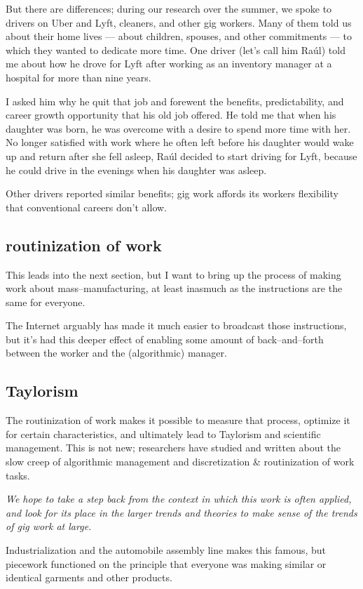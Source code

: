 \documentclass{sigchi}
\begin{document}
But there are differences; during our research over the summer,
we spoke to drivers on Uber and Lyft, cleaners, and other gig workers.
Many of them told us about their home lives
--- about children, spouses, and other commitments ---
to which they wanted to dedicate more time.
One driver
(let's call him Ra\'{u}l)
told me about how he drove for Lyft
after working as an inventory manager at a hospital for more than nine years.

I asked him why he quit that job and forewent
the benefits,
predictability,
and career growth opportunity
that his old job offered.
He told me that when his daughter was born,
he was overcome with a desire to spend more time with her.
No longer satisfied with work
where he often left before his daughter would wake up and return after she fell asleep,
Ra\'{u}l decided to start driving for Lyft,
because he could drive in the evenings when his daughter was asleep.

Other drivers reported similar benefits;
gig work affords its workers flexibility that conventional careers don't allow.

\subsection{routinization of work}
This leads into the next section, but I want to bring up the process of
making work about mass--manufacturing, at least inasmuch as
the instructions are the same for everyone.

The Internet arguably has made it much easier to broadcast those instructions,
but it's had this deeper effect of enabling some amount of back--and--forth
between the worker and the (algorithmic) manager.

\subsection{Taylorism}
The routinization of work makes it possible to measure that process,
optimize it for certain characteristics, and ultimately
lead to Taylorism and scientific management.
This is not new;
researchers have studied and written about the slow creep of
algorithmic management and 
discretization \& routinization of work tasks.

\textit{We hope to take a step back from the context in which this work is often applied, and
look for its place in the larger trends and theories
to make sense of the trends of gig work at large.}

Industrialization and the automobile assembly line makes this famous,
but piecework functioned on the principle that everyone was making similar
or identical
garments and other products.
\end{document}
